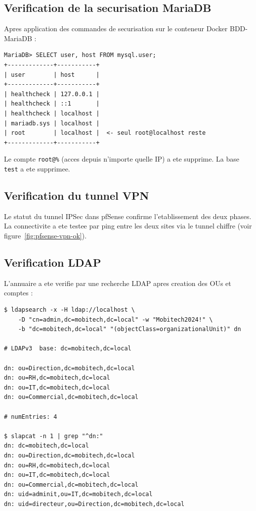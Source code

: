\documentclass[11pt,a4paper]{article}
\begin{document}
\subsection{Verification de la securisation MariaDB}

Apres application des commandes de securisation sur le conteneur Docker BDD-MariaDB :

\begin{lstlisting}[caption={Verification des comptes MariaDB apres securisation}]
MariaDB> SELECT user, host FROM mysql.user;
+-------------+-----------+
| user        | host      |
+-------------+-----------+
| healthcheck | 127.0.0.1 |
| healthcheck | ::1       |
| healthcheck | localhost |
| mariadb.sys | localhost |
| root        | localhost |  <- seul root@localhost reste
+-------------+-----------+
\end{lstlisting}

Le compte \texttt{root@\%} (acces depuis n'importe quelle IP) a ete supprime. La base \texttt{test} a ete supprimee.

\subsection{Verification du tunnel VPN}

Le statut du tunnel IPSec dans pfSense confirme l'etablissement des deux phases. La connectivite a ete testee par ping entre les deux sites via le tunnel chiffre (voir figure~\ref{fig:pfsense-vpn-ok}).

\subsection{Verification LDAP}

L'annuaire a ete verifie par une recherche LDAP apres creation des OUs et comptes :

\begin{lstlisting}[caption={Sortie reelle -- ldapsearch sur AD-LDAP}]
$ ldapsearch -x -H ldap://localhost \
    -D "cn=admin,dc=mobitech,dc=local" -w "Mobitech2024!" \
    -b "dc=mobitech,dc=local" "(objectClass=organizationalUnit)" dn

# LDAPv3  base: dc=mobitech,dc=local

dn: ou=Direction,dc=mobitech,dc=local
dn: ou=RH,dc=mobitech,dc=local
dn: ou=IT,dc=mobitech,dc=local
dn: ou=Commercial,dc=mobitech,dc=local

# numEntries: 4

$ slapcat -n 1 | grep "^dn:"
dn: dc=mobitech,dc=local
dn: ou=Direction,dc=mobitech,dc=local
dn: ou=RH,dc=mobitech,dc=local
dn: ou=IT,dc=mobitech,dc=local
dn: ou=Commercial,dc=mobitech,dc=local
dn: uid=adminit,ou=IT,dc=mobitech,dc=local
dn: uid=directeur,ou=Direction,dc=mobitech,dc=local
\end{lstlisting}
\end{document}
